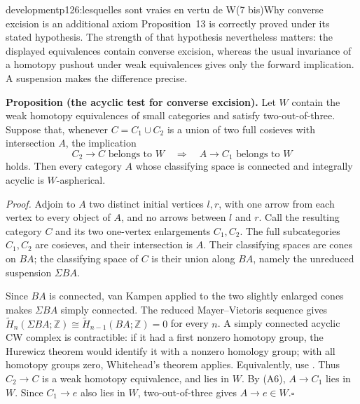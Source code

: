 \begin{dcomment}{development}{p126:lesquelles sont vraies en vertu de W(7 bis)}{Why converse excision is an additional axiom}
Proposition~13 is correctly proved under its stated hypothesis.  The strength of that hypothesis nevertheless matters: the displayed equivalences contain converse excision, whereas the usual invariance of a homotopy pushout under weak equivalences gives only the forward implication.  A suspension makes the difference precise.

\textbf{Proposition (the acyclic test for converse excision).}\ours
Let $W$ contain the weak homotopy equivalences of small categories and satisfy two-out-of-three.  Suppose that, whenever $C=C_1\cup C_2$ is a union of two full cosieves with intersection $A$, the implication
\[
 C_2\longrightarrow C\text{ belongs to }W
 \quad\Longrightarrow\quad A\longrightarrow C_1\text{ belongs to }W
 \tag{A6}
\]
holds.  Then every category $A$ whose classifying space is connected and integrally acyclic is $W$-aspherical.

\emph{Proof.}
Adjoin to $A$ two distinct initial vertices $l,r$, with one arrow from each vertex to every object of $A$, and no arrows between $l$ and $r$.  Call the resulting category $C$ and its two one-vertex enlargements $C_1,C_2$.  The full subcategories $C_1,C_2$ are cosieves, and their intersection is $A$.  Their classifying spaces are cones on $BA$; the classifying space of $C$ is their union along $BA$, namely the unreduced suspension $\Sigma BA$.

Since $BA$ is connected, van Kampen applied to the two slightly enlarged cones makes $\Sigma BA$ simply connected.  The reduced Mayer--Vietoris sequence gives $\widetilde H_n(\Sigma BA;\mathbb Z)\cong\widetilde H_{n-1}(BA;\mathbb Z)=0$ for every $n$.  A simply connected acyclic CW complex is contractible: if it had a first nonzero homotopy group, the Hurewicz theorem would identify it with a nonzero homology group; with all homotopy groups zero, Whitehead's theorem applies.  Equivalently, use \citet[Corollary~4.33]{Hatcher2002}.  Thus $C_2\to C$ is a weak homotopy equivalence, and lies in $W$.  By (A6), $A\to C_1$ lies in $W$.  Since $C_1\to e$ also lies in $W$, two-out-of-three gives $A\to e\in W$.\hfill$\square$


\end{dcomment}
